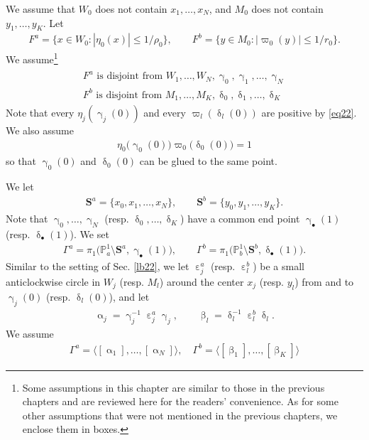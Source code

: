 \documentclass[12pt,a4paper,notitlepage]{article}
\theoremstyle{definition}
\theoremstyle{plain}
\newcommand{\bk}[1]{\langle {#1}\rangle}
\newcommand{\blt}{\bullet}
\newcommand{\Pbb}{\mathbb P}
\newcommand{\Sbf}{\mathbf{S}}
\numberwithin{equation}{subsection}
\begin{document}
We assume that $W_0$ does not contain $x_1,\dots,x_N$, and $M_0$ does not contain $y_1,\dots,y_K$. Let
\begin{align*}
F^a=\{x\in W_0:|\eta_0(x)|\leq 1/\rho_0\},\qquad F^b=\{y\in M_0:|\varpi_0(y)|\leq 1/r_0\}.	
\end{align*}
We assume\footnote{Some assumptions in this chapter are similar to those in the previous chapters and are reviewed here for the readers' convenience. As for some other assumptions that were not mentioned in the previous chapters, we enclose them in boxes.}
\begin{gather}\label{eq90}
\boxed{~\begin{array}{c}
F^a\text{ is disjoint from }	W_1,\dots,W_N,\upgamma_0,\upgamma_1,\dots,\upgamma_N\\[0.8ex]
F^b\text{ is disjoint from }M_1,\dots,M_K,\updelta_0,\updelta_1,\dots,\updelta_K
\end{array}~}
\end{gather}
Note that every $\eta_j(\upgamma_j(0))$ and every $\varpi_l(\updelta_l(0))$ are positive by \eqref{eq22}. We also assume
\begin{align}
\boxed{~\eta_0\big(\upgamma_0(0)\big)\varpi_0\big(\updelta_0(0)\big)=1~}	\label{eq54}
\end{align}
so that $\upgamma_0(0)$ and $\updelta_0(0)$ can be glued to the same point.




We let
\begin{align*}
\Sbf^a=\{x_0,x_1,\dots,x_N\},\qquad \Sbf^b=\{y_0,y_1,\dots,y_K\}.	
\end{align*}
Note that $\upgamma_0,\dots,\upgamma_N$ (resp. $\updelta_0,\dots,\updelta_K$) have a common end point $\upgamma_\blt(1)$ (resp. $\updelta_\blt(1)$). We set
\begin{align*}
\Gamma^a=\pi_1\big(\Pbb^1_a\setminus\Sbf^a,\upgamma_\blt(1)\big),\qquad \Gamma^b=\pi_1\big(\Pbb^1_b\setminus\Sbf^b,\updelta_\blt(1)\big).
\end{align*}
Similar to the setting of Sec. \ref{lb22}, we let $\upepsilon_j^a$ (resp. $\upepsilon_l^b$) be a small anticlockwise circle in $W_j$ (resp. $M_l$) around the center $x_j$ (resp. $y_l$) from and to $\upgamma_j(0)$ (resp. $\updelta_l(0)$), and let
\begin{align}
\upalpha_j=\upgamma_j^{-1}\upepsilon_j^a\upgamma_j,\qquad\upbeta_l=\updelta_l^{-1}\upepsilon_l^b\updelta_l.\label{eq56}
\end{align}
We assume
\begin{align}
\boxed{~\Gamma^a=\bk{[\upalpha_1],\dots,[\upalpha_N]},\quad\Gamma^b=\bk{[\upbeta_1],\dots,[\upbeta_K]}~}	\label{eq86}
\end{align}
\end{document}
